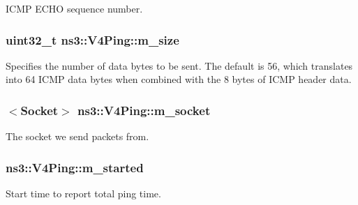 I\+C\+MP E\+C\+HO sequence number. 

\subsubsection[{\texorpdfstring{m\+\_\+size}{m_size}}]{\setlength{\rightskip}{0pt plus 5cm}uint32\+\_\+t ns3\+::\+V4\+Ping\+::m\+\_\+size\hspace{0.3cm}{\ttfamily [private]}}\hypertarget{classns3_1_1V4Ping_a15214114a8580f6e7c56ad18267b2199}{}\label{classns3_1_1V4Ping_a15214114a8580f6e7c56ad18267b2199}
Specifies the number of data bytes to be sent. The default is 56, which translates into 64 I\+C\+MP data bytes when combined with the 8 bytes of I\+C\+MP header data. 
\subsubsection[{\texorpdfstring{m\+\_\+socket}{m_socket}}]{$<${\bf Socket}$>$ ns3\+::\+V4\+Ping\+::m\+\_\+socket\hspace{0.3cm}{\ttfamily [private]}}\hypertarget{classns3_1_1V4Ping_a1f778736aaa1d07de9bb66375f20942f}{}\label{classns3_1_1V4Ping_a1f778736aaa1d07de9bb66375f20942f}


The socket we send packets from. 

\subsubsection[{\texorpdfstring{m\+\_\+started}{m_started}}]{ ns3\+::\+V4\+Ping\+::m\+\_\+started\hspace{0.3cm}{\ttfamily [private]}}\hypertarget{classns3_1_1V4Ping_af7dd3e807bcafb10bb3ce472e9181e8c}{}\label{classns3_1_1V4Ping_af7dd3e807bcafb10bb3ce472e9181e8c}


Start time to report total ping time. 

